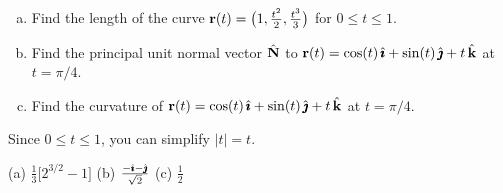 
\begin{question}[M317 2015A]  %

\begin{enumerate}[(a)]
\item
Find the length of the curve  $\mathbf{r}(t)=\big(1,\frac{t^2}{2},\frac{t^3}{3}\big)$
for $0\le t\le 1$.

\item
Find the principal unit normal vector $\hat{\mathbf{N}}$ to $\mathbf{r}(t) = \cos(t)\,\hat{\pmb{\imath}} + \sin(t)\,\hat{\pmb{\jmath}} 
+ t\,\hat{\mathbf{k}}$ at $t =\pi/4$.

\item
Find the curvature of $\mathbf{r}(t) = \cos(t)\,\hat{\pmb{\imath}} + \sin(t)\,\hat{\pmb{\jmath}} + t\,\hat{\mathbf{k}}$ 
at $t = \pi/4$.

\end{enumerate}
\end{question}

\begin{hint} 
	Since $0 \le t \le 1$, you can simplify $|t|=t$.
\end{hint}

\begin{answer} 
(a) $\frac{1}{3}\big[2^{3/2}-1\big]$\qquad
(b) $\frac{-\hat{\pmb{\imath}} - \hat{\pmb{\jmath}}}{\sqrt{2}}$\qquad
(c) $\frac{1}{2}$
\end{answer}

